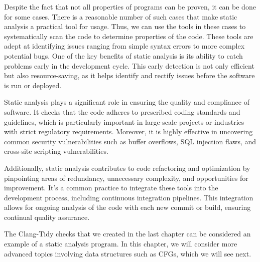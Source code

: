 Despite the fact that not all properties of programs can be proven, it can be done for some cases. There is a reasonable number of such cases that make static analysis a practical tool for usage. Thus, we can use the tools in these cases to systematically scan the code to determine properties of the code. These tools are adept at identifying issues ranging from simple syntax errors to more complex potential bugs. One of the key benefits of static analysis is its ability to catch problems early in the development cycle. This early detection is not only efficient but also resource-saving, as it helps identify and rectify issues before the software is run or deployed.

Static analysis plays a significant role in ensuring the quality and compliance of software. It checks that the code adheres to prescribed coding standards and guidelines, which is particularly important in large-scale projects or industries with strict regulatory requirements. Moreover, it is highly effective in uncovering common security vulnerabilities such as buffer overflows, SQL injection flaws, and cross-site scripting vulnerabilities.

Additionally, static analysis contributes to code refactoring and optimization by pinpointing areas of redundancy, unnecessary complexity, and opportunities for improvement. It’s a common practice to integrate these tools into the development process, including continuous integration pipelines. This integration allows for ongoing analysis of the code with each new commit or build, ensuring continual quality assurance.

The Clang-Tidy checks that we created in the last chapter can be considered an example of a static analysis program. In this chapter, we will consider more advanced topics involving data structures such as CFGs, which we will see next.